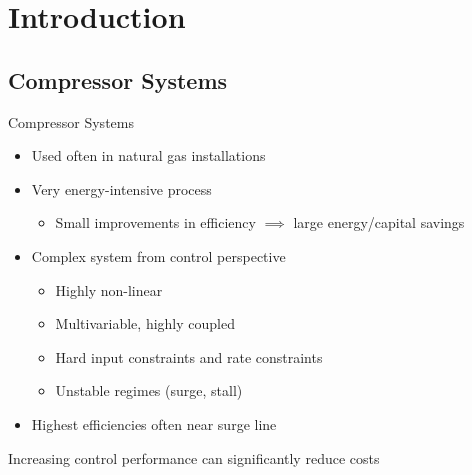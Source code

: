 \section{Introduction}

\subsection{Compressor Systems}

\begin{frame}{Compressor Systems}
  \begin{itemize}
    \item Used often in natural gas installations
    \item Very energy-intensive process
      \begin{itemize}
        \item Small improvements in efficiency $\implies$ large energy/capital savings
      \end{itemize}
    \item Complex system from control perspective
      \begin{itemize}
        \item Highly non-linear
        \item Multivariable, highly coupled
        \item Hard input constraints and rate constraints
        \item Unstable regimes (surge, stall)
      \end{itemize}
    \item Highest efficiencies often near surge line
  \end{itemize}

  \vfill
  \pause
  \alert{\centering Increasing control performance can significantly reduce costs\\}
\end{frame}

